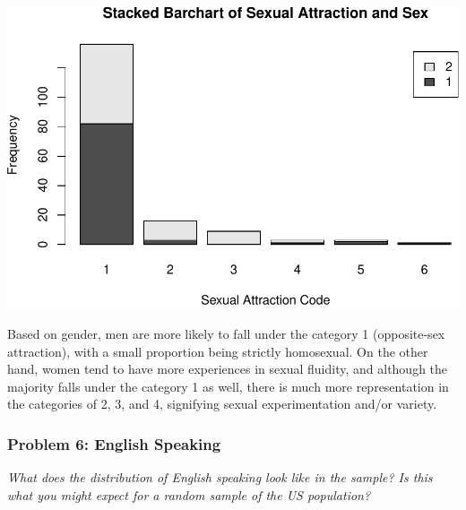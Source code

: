 \documentclass[
]{article}
\newenvironment{Shaded}{\begin{snugshade}}{\end{snugshade}}
\newcommand{\AttributeTok}[1]{\textcolor[rgb]{0.77,0.63,0.00}{#1}}
\newcommand{\CommentTok}[1]{\textcolor[rgb]{0.56,0.35,0.01}{\textit{#1}}}
\newcommand{\ConstantTok}[1]{\textcolor[rgb]{0.00,0.00,0.00}{#1}}
\newcommand{\FunctionTok}[1]{\textcolor[rgb]{0.00,0.00,0.00}{#1}}
\newcommand{\NormalTok}[1]{#1}
\newcommand{\OtherTok}[1]{\textcolor[rgb]{0.56,0.35,0.01}{#1}}
\newcommand{\SpecialCharTok}[1]{\textcolor[rgb]{0.00,0.00,0.00}{#1}}
\newcommand{\StringTok}[1]{\textcolor[rgb]{0.31,0.60,0.02}{#1}}
\begin{document}
\includegraphics{Journal_files/figure-latex/unnamed-chunk-18-1.pdf}

Based on gender, men are more likely to fall under the category 1
(opposite-sex attraction), with a small proportion being strictly
homosexual. On the other hand, women tend to have more experiences in
sexual fluidity, and although the majority falls under the category 1 as
well, there is much more representation in the categories of 2, 3, and
4, signifying sexual experimentation and/or variety.

\hypertarget{problem-6-english-speaking}{%
\subsubsection{Problem 6: English
Speaking}\label{problem-6-english-speaking}}

\emph{What does the distribution of English speaking look like in the
sample? Is this what you might expect for a random sample of the US
population?}

\begin{Shaded}
\end{Shaded}
\end{document}
